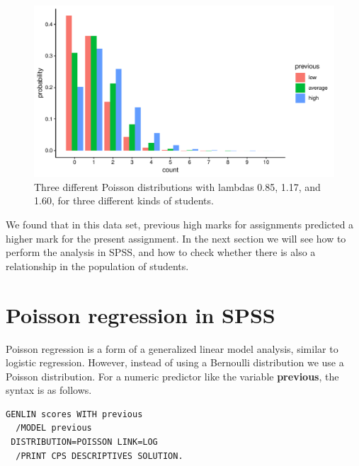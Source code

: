 \documentclass[]{book}\usepackage[]{graphicx}\usepackage[]{color}
\makeatletter
\def\maxwidth{ %
  \ifdim\Gin@nat@width>\linewidth
    \linewidth
  \else
    \Gin@nat@width
  \fi
}
\newenvironment{knitrout}{}{} %
\makeatother
\begin{document}
\begin{knitrout}
\color{fgcolor}\begin{figure}

{\centering \includegraphics[width=\maxwidth]{figure/gen_19-1} 

}

\caption[Three different Poisson distributions with lambdas 0.85, 1.17, and 1.60, for three different kinds of students]{Three different Poisson distributions with lambdas 0.85, 1.17, and 1.60, for three different kinds of students.}\label{fig:gen_19}
\end{figure}


\end{knitrout}



We found that in this data set, previous high marks for assignments predicted a higher mark for the present assignment. In the next section we will see how to perform the analysis in SPSS, and how to check whether there is also a relationship in the population of students.

\section{Poisson regression in SPSS}

Poisson regression is a form of a generalized linear model analysis, similar to logistic regression. However, instead of using a Bernoulli distribution we use a Poisson distribution. For a numeric predictor like the variable \textbf{previous}, the syntax is as follows.

\begin{verbatim}
GENLIN scores WITH previous
  /MODEL previous
 DISTRIBUTION=POISSON LINK=LOG
  /PRINT CPS DESCRIPTIVES SOLUTION.
\end{verbatim}
\end{document}
